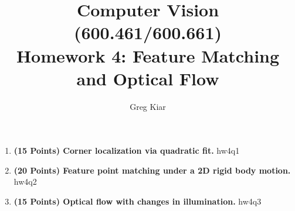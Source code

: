 \documentclass[10pt]{article}
\begin{document}
\title{
\vspace{-19mm}
Computer Vision (600.461/600.661)\\
Homework 4: Feature Matching and Optical Flow}
\author{Greg Kiar}


\maketitle

\begin{enumerate}

\item \textbf{(15 Points) Corner localization via quadratic fit.} 
 {hw4q1}

\item \textbf{(20 Points) Feature point matching under a 2D rigid body motion.}\\
 {hw4q2}

\item \textbf{(15 Points) Optical flow with changes in illumination.}
 {hw4q3}

\end{enumerate}
\end{document}
